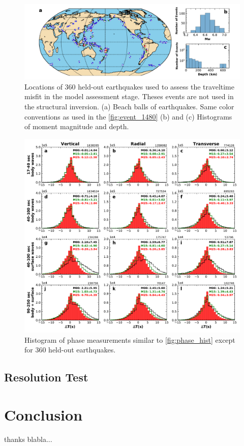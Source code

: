 \documentclass[extra,mreferee]{gji}
\begin{document}
\begin{figure}
\includegraphics[width=\textwidth]{figures/events_360.pdf}
  \caption{Locations of 360 held-out earthquakes used to assess the traveltime misfit in the model assessment stage. Theses events are not used in the structural inversion. (a) Beach balls of earthquakes. Same color conventions as used in the \ref{fig:event_1480} (b) and (c) Histograms of moment magnitude and depth.}
\centering
\end{figure}

\begin{figure}
\includegraphics[width=\textwidth]{figures/dt_histogram_360.pdf}
  \caption{Histogram of phase measurements similar to \ref{fig:phase_hist} except for 360 held-out earthquakes.}
\centering
\end{figure}

\subsection{Resolution Test}

\section{Conclusion}


\begin{acknowledgments}
thanks blabla...
\end{acknowledgments}

\newpage


\end{document}
